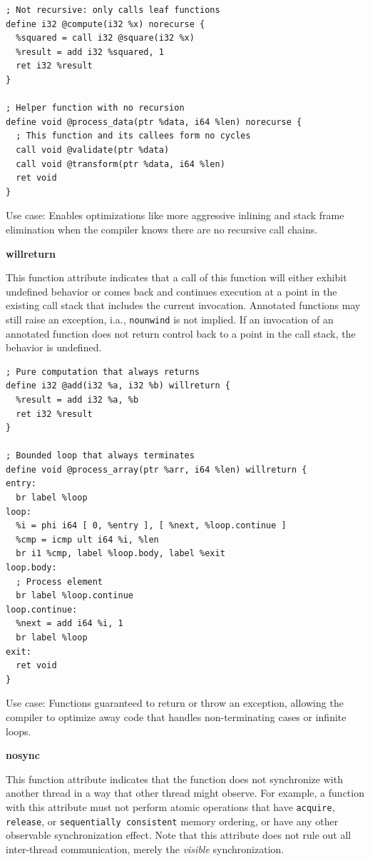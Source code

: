 \begin{lstlisting}[style=ir]
; Not recursive: only calls leaf functions
define i32 @compute(i32 %x) norecurse {
  %squared = call i32 @square(i32 %x)
  %result = add i32 %squared, 1
  ret i32 %result
}

; Helper function with no recursion
define void @process_data(ptr %data, i64 %len) norecurse {
  ; This function and its callees form no cycles
  call void @validate(ptr %data)
  call void @transform(ptr %data, i64 %len)
  ret void
}
\end{lstlisting}

Use case: Enables optimizations like more aggressive inlining and stack frame elimination when the compiler knows there are no recursive call chains.

\textbf{willreturn}

This function attribute indicates that a call of this function will either exhibit undefined behavior or comes back and continues execution at a point in the existing call stack that includes the current invocation.
Annotated functions may still raise an exception, i.a., \texttt{nounwind} is not implied.
If an invocation of an annotated function does not return control back to a point in the call stack, the behavior is undefined.

\begin{lstlisting}[style=ir]
; Pure computation that always returns
define i32 @add(i32 %a, i32 %b) willreturn {
  %result = add i32 %a, %b
  ret i32 %result
}

; Bounded loop that always terminates
define void @process_array(ptr %arr, i64 %len) willreturn {
entry:
  br label %loop
loop:
  %i = phi i64 [ 0, %entry ], [ %next, %loop.continue ]
  %cmp = icmp ult i64 %i, %len
  br i1 %cmp, label %loop.body, label %exit
loop.body:
  ; Process element
  br label %loop.continue
loop.continue:
  %next = add i64 %i, 1
  br label %loop
exit:
  ret void
}
\end{lstlisting}

Use case: Functions guaranteed to return or throw an exception, allowing the compiler to optimize away code that handles non-terminating cases or infinite loops.

\textbf{nosync}

This function attribute indicates that the function does not synchronize with another thread in a way that other thread might observe.
For example, a function with this attribute must not perform atomic operations that have \texttt{acquire}, \texttt{release}, or \texttt{sequentially consistent} memory ordering,
or have any other observable synchronization effect.
Note that this attribute does not rule out all inter-thread communication, merely the \emph{visible} synchronization.

